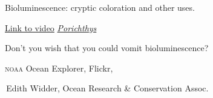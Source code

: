 \documentclass[t]{beamer}
\begin{document}
%
{
\begin{frame}{}
\end{frame}
}
%
{
\begin{frame}{}
\end{frame}
}
%
{
\begin{frame}{}
\end{frame}
}
%
{
\begin{frame}{}
\end{frame}
}
%
{
\begin{frame}{}
\end{frame}
}
%
{
\begin{frame}{}
\end{frame}
}
%
{
\begin{frame}{}
\end{frame}
}
%


{
\begin{frame}[b]{\textcolor{biolum}{Bioluminescence: cryptic coloration and other uses.}}

	\tiny\textcolor{biolum}{\href{https://www.youtube.com/watch?v=UXl8F-eIoiM}{Link to video} \hfill \href{http://biolum.eemb.ucsb.edu/organism/movies/porichthys.mov}{\textit{Porichthys}}}
\end{frame}
}
%
{
\begin{frame}[b]{\textcolor{biolum}{Don't you wish that you could vomit bioluminescence?}}

\hfill \tiny \textcolor{biolum}{\textsc{noaa} Ocean Explorer, Flickr, }
\end{frame}
}
%
{
\begin{frame}[b]

\tiny \textcolor{biolum}{\textcopyright\,Edith Widder, Ocean Research \& Conservation Assoc.}
\end{frame}
}
\end{document}
